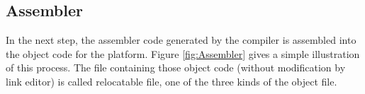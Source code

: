             
             

             
             
             
    \subsection{Assembler} \label{subsection:Assembler}
        In the next step, the assembler code generated by the compiler is assembled into the object code for the platform. Figure \ref{fig:Assembler} gives a simple illustration of this process. The file containing those object code (without modification by link editor) is called relocatable file\cite{TIS-95}, one of the three kinds of the object file. 
        
